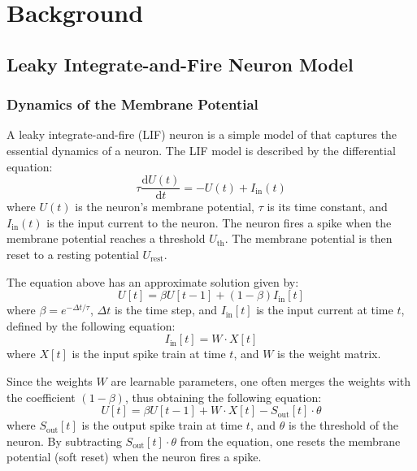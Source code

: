 \chapter{Background}
\label{chap:background}

\section{Leaky Integrate-and-Fire Neuron Model}
\label{sec:lif}

    \subsection{Dynamics of the Membrane Potential}
    \label{subsec:lif_dynamics}
        A leaky integrate-and-fire (LIF) neuron is a simple model of that captures the essential dynamics of a neuron. The LIF model is described by the differential equation:
        \begin{equation}
            \tau \frac{\mathrm{d}U(t)}{\mathrm{d}t} = -U(t) + I_{\text{in}}(t)
        \end{equation}
        where $U(t)$ is the neuron's membrane potential, $\tau$ is its time constant, and $I_{\text{in}}(t)$ is the input current to the neuron. The neuron fires a spike when the membrane potential reaches a threshold $U_{\text{th}}$. The membrane potential is then reset to a resting potential $U_{\text{rest}}$. 

        The equation above has an approximate solution given by:
        \begin{equation}
            U[t] = \beta U[t-1] + (1 - \beta) I_{\text{in}}[t]
        \end{equation}
        where $\beta = e^{-\Delta t/\tau}$, $\Delta t$ is the time step, and $I_{\text{in}}[t]$ is the input current at time $t$, defined by the following equation:
        \begin{equation}
            I_{\text{in}}[t] = W\cdot X[t]
        \end{equation}
        where $X[t]$ is the input spike train at time $t$, and $W$ is the weight matrix. 

        Since the weights $W$ are learnable parameters, one often merges the weights with the coefficient $(1 - \beta)$, thus obtaining the following equation:
        \begin{equation}
            U[t] = \beta U[t-1] + W\cdot X[t] - S_{\text{out}}[t]\cdot\theta
        \end{equation}
        where $S_{\text{out}}[t]$ is the output spike train at time $t$, and $\theta$ is the threshold of the neuron. 
        By subtracting $S_{\text{out}}[t]\cdot\theta$ from the equation, one resets the membrane potential (soft reset) when the neuron fires a spike.

